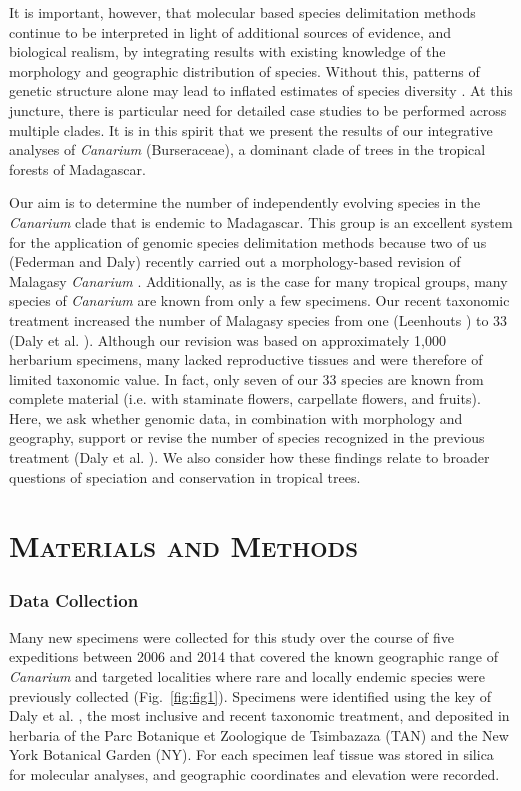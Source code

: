 \documentclass[10pt,letterpaper]{article}
\begin{document}
It is important, however, that molecular based species delimitation methods continue to be interpreted in light of additional sources of evidence, and biological realism, by integrating results with existing knowledge of the morphology and geographic distribution of species. Without this, patterns of genetic structure alone may lead to inflated estimates of species diversity \cite{sukumaran_multispecies_2017}. At this juncture, there is particular need for detailed case studies to be performed across multiple clades. It is in this spirit that we present the results of our integrative analyses of \emph{Canarium} (Burseraceae), a dominant clade of trees in the tropical forests of Madagascar. 

Our aim is to determine the number of independently evolving species in the \emph{Canarium} clade that is endemic to Madagascar. This group is an excellent system for the application of genomic species delimitation methods because two of us (Federman and Daly) recently carried out a morphology-based revision of Malagasy \emph{Canarium} \cite{daly_revision_2015}. Additionally, as is the case for many tropical groups, many species of \emph{Canarium} are known from only a few specimens. Our recent taxonomic treatment increased the number of Malagasy species from one (Leenhouts \cite{leenhouts_revision_1959}) to 33 (Daly et al. \cite{daly_revision_2015}). Although our revision was based on approximately 1,000 herbarium specimens, many lacked reproductive tissues and were therefore of limited taxonomic value. In fact, only seven of our 33 species are known from complete material (i.e. with staminate flowers, carpellate flowers, and fruits). Here, we ask whether genomic data, in combination with morphology and geography, support or revise the number of species recognized in the previous treatment (Daly et al. \cite{daly_revision_2015}). We also consider how these findings relate to broader questions of speciation and conservation in tropical trees.


\section*{M\textsc{aterials and }M\textsc{ethods}}
\subsubsection*{Data Collection}
Many new specimens were collected for this study over the course of five expeditions between 2006 and 2014 that covered the known geographic range of \emph{Canarium} and targeted localities where rare and locally endemic species were previously collected (Fig.~\ref{fig:fig1}). Specimens were identified using the key of Daly et al. \cite{daly_revision_2015}, the most inclusive and recent taxonomic treatment, and deposited in herbaria of the Parc Botanique et Zoologique de Tsimbazaza (TAN) and the New York Botanical Garden (NY). For each specimen leaf tissue was stored in silica for molecular analyses, and geographic coordinates and elevation were recorded. 
\end{document}

